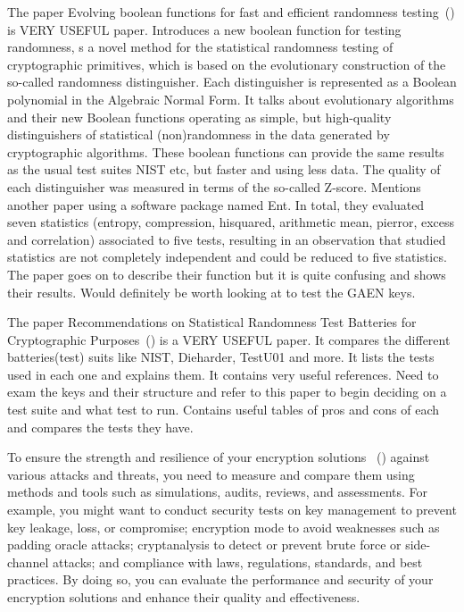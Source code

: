 The paper Evolving boolean functions for fast and efficient randomness testing~(\cite{10.1145/3205455.3205518}) is VERY USEFUL paper. Introduces a new boolean function for testing randomness, s a novel method for the statistical randomness testing of cryptographic primitives, which is based on the evolutionary construction of the so-called randomness distinguisher. Each distinguisher is represented as a Boolean polynomial in the Algebraic Normal Form. It talks about evolutionary algorithms and their new Boolean functions operating as simple, but high-quality distinguishers of statistical (non)randomness in the data generated by cryptographic algorithms. These boolean functions can provide the same results as the usual test suites NIST etc, but faster and using less data.  The quality of each distinguisher was measured in terms of the so-called Z-score. Mentions another paper using a software package named Ent. In total, they evaluated seven statistics (entropy, compression, hisquared, arithmetic mean, pierror, excess and correlation) associated to five tests, resulting in an observation that studied statistics are not completely independent and could be reduced to five statistics. The paper goes on to describe their function but it is quite confusing and shows their results. Would definitely be worth looking at to test the GAEN keys.\par

The paper Recommendations on Statistical Randomness Test Batteries for Cryptographic Purposes~(\cite{10.1145/3447773}) is a VERY USEFUL paper. It compares the different batteries(test) suits like NIST, Dieharder, TestU01 and more. It lists the tests used in each one and explains them. It contains very useful references. Need to exam the keys and their structure and refer to this paper to begin deciding on a test suite and what test to run. Contains useful tables of pros and cons of each and compares the tests they have.\par

To ensure the strength and resilience of your encryption solutions ~(\cite{linkedInArticle}) against various attacks and threats, you need to measure and compare them using methods and tools such as simulations, audits, reviews, and assessments. For example, you might want to conduct security tests on key management to prevent key leakage, loss, or compromise; encryption mode to avoid weaknesses such as padding oracle attacks; cryptanalysis to detect or prevent brute force or side-channel attacks; and compliance with laws, regulations, standards, and best practices. By doing so, you can evaluate the performance and security of your encryption solutions and enhance their quality and effectiveness.\par

